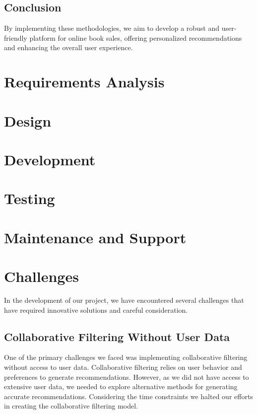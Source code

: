 \documentclass{article}
\begin{document}
\subsection{Conclusion}

By implementing these methodologies, we aim to develop a robust and user-friendly platform for online book sales, offering personalized recommendations and enhancing the overall user experience.


\section{Requirements Analysis}

\section{Design}

\section{Development}

\section{Testing}

\section{Maintenance and Support}

\section{Challenges}

In the development of our project, we have encountered several challenges that have required innovative solutions and careful consideration.

\subsection{Collaborative Filtering Without User Data}

One of the primary challenges we faced was implementing collaborative filtering without access to user data. Collaborative filtering relies on user behavior and preferences to generate recommendations. However, as we did not have access to extensive user data, we needed to explore alternative methods for generating accurate recommendations. Considering the time constraints we halted our efforts in creating the collaborative filtering model.
\end{document}

